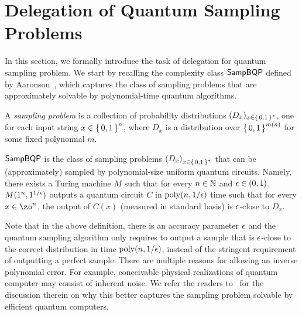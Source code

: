 \section{Delegation of Quantum Sampling Problems} \label{sec:samp_definition}

In this section, we formally introduce the task of delegation for quantum sampling problem. We start by recalling the complexity class $\SampBQP$ defined by Aaronson~\cite{aaronson_2013, aaronson_arkhipov_2011}, which captures the class of sampling problems that
are approximately solvable by polynomial-time quantum algorithms.


\begin{definition} 
    \label{dfn:sampling-problem}
    A \emph{sampling problem} is a collection of probability distributions $(D_x)_{x\in\set{0, 1}^*}$, one for each input string $x\in\set{0,1}^n$, where $D_x$ is a distribution over $\set{0,1}^{m(n)}$ for some fixed polynomial $m$.
\end{definition}

\begin{definition} [$\SampBQP$]
    $\SampBQP$ is the class of sampling problems $\left(D_x\right)_{x\in\set{0, 1}^*}$ that can be (approximately) sampled by polynomial-size uniform quantum circuits. Namely, there exists a Turing machine $M$ such that for every $n \in \mathbb{N}$ and $\epsilon \in (0,1)$, $M(1^n, 1^{1/\epsilon})$ outputs a quantum circuit $C$ in $\operatorname*{\operatorname{poly}}(n, 1/\epsilon)$ time such that for every $x \in \zo^n$, the output of $C(x)$ (measured in standard basis) is $\epsilon$-close to $D_x$.
\end{definition}

Note that in the above definition, there is an accuracy parameter $\epsilon$ and the quantum sampling algorithm only requires to output a sample that is $\epsilon$-close to the correct distribution in time $\operatorname*{\operatorname{poly}}(n,1/\epsilon)$, instead of the stringent requirement of outputting a perfect sample. There are multiple reasons for allowing an inverse polynomial error. For example, conceivable physical realizations of quantum computer may consist of inherent noise. We refer the readers to~\cite{aaronson_2013, aaronson_arkhipov_2011} for the discussion therein on why this better captures the sampling problem solvable by efficient quantum computers. 


